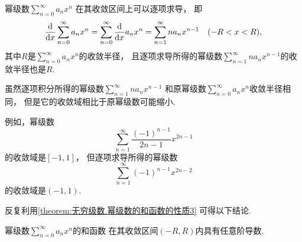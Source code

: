 \begin{property}\label{theorem:无穷级数.幂级数的和函数的性质3}
幂级数\(\sum_{n=0}^\infty a_n x^n\)
在其收敛区间上可以逐项求导，
即\begin{equation}
	\dv{x} \sum_{n=0}^\infty a_n x^n
	= \sum_{n=0}^\infty \dv{x} a_n x^n
	= \sum_{n=1}^\infty n a_n x^{n-1}
	\quad(-R<x<R),
\end{equation}
其中\(R\)是\(\sum_{n=0}^\infty a_n x^n\)的收敛半径，
且逐项求导所得的幂级数\(\sum_{n=1}^\infty n a_n x^{n-1}\)的收敛半径也是\(R\).
\end{property}
\begin{remark}
虽然逐项积分所得的幂级数\(\sum_{n=1}^\infty n a_n x^{n-1}\)
和原幂级数\(\sum_{n=0}^\infty a_n x^n\)收敛半径相同，
但是它的收敛域相比于原幂级数可能缩小.

例如，幂级数\[
	\sum_{n=1}^\infty \frac{(-1)^{n-1}}{2n-1} x^{2n-1}
\]的收敛域是\([-1,1]\)，
但逐项求导所得的幂级数\[
	\sum_{n=1}^\infty (-1)^{n-1} x^{2n-2}
\]的收敛域是\((-1,1)\).
\end{remark}

反复利用\cref{theorem:无穷级数.幂级数的和函数的性质3} 可得以下结论.
\begin{proposition}
幂级数\(\sum_{n=0}^\infty a_n x^n\)的和函数
在其收敛区间\((-R,R)\)内具有任意阶导数.
\end{proposition}

